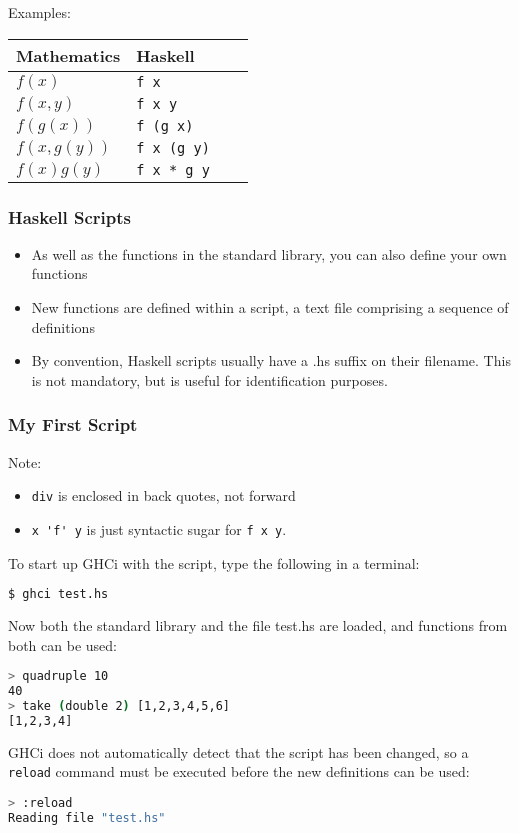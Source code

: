 \begin{multicols}{2}
Examples:\\
\begin{tabular}{|p{0.5\linewidth}|p{0.5\linewidth}|}
\hline
\textbf{Mathematics} & \textbf{Haskell} \\
\hline
$f(x)$ & \lstinline|f x| \\
$f(x,y)$ & \lstinline|f x y| \\
$f(g(x))$ & \lstinline|f (g x)| \\
$f(x,g(y))$ & \lstinline|f x (g y)| \\
$f(x)g(y)$ & \lstinline|f x * g y| \\
\hline
\end{tabular}

\subsubsection{Haskell Scripts}
\begin{itemize}
    \item As well as the functions in the standard library, you can also define your own functions
    \item New functions are defined within a script, a text file comprising a sequence of definitions
    \item By convention, Haskell scripts usually have a .hs suffix on their filename. This is not mandatory, but is useful for identification purposes.
\end{itemize}

\subsubsection{My First Script}


Note:
\begin{itemize}
    \item \lstinline{div} is enclosed in back quotes, not forward
    \item \lstinline{x 'f' y} is just syntactic sugar for \lstinline{f x y}.
\end{itemize}

To start up GHCi with the script, type the following in a terminal:
\begin{lstlisting}[language=bash]
$ ghci test.hs
\end{lstlisting}
Now both the standard library and the file test.hs are loaded, and functions from both can be used:
\begin{lstlisting}[language=bash]
> quadruple 10
40
> take (double 2) [1,2,3,4,5,6]
[1,2,3,4]
\end{lstlisting}
GHCi does not automatically detect that the script has been changed, so a \lstinline[language=bash]{reload} command must be executed before the new definitions can be used:
\begin{lstlisting}[language=bash]
> :reload
Reading file "test.hs"
\end{lstlisting}


\end{multicols}
